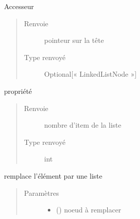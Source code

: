\documentclass[letterpaper,10pt,french]{sphinxmanual}
\begin{document}
\begin{fulllineitems}

\begin{fulllineitems}
\label{\detokenize{linkedlistnode:linkedlistnode.LinkedList.head}}
Accesseur
\begin{quote}\begin{description}
\item[{Renvoie}] \leavevmode
pointeur sur la tête

\item[{Type renvoyé}] \leavevmode
Optional{[}« LinkedListNode »{]}

\end{description}\end{quote}

\end{fulllineitems}


\begin{fulllineitems}
\label{\detokenize{linkedlistnode:linkedlistnode.LinkedList.length}}
propriété
\begin{quote}\begin{description}
\item[{Renvoie}] \leavevmode
nombre d’item de la liste

\item[{Type renvoyé}] \leavevmode
int

\end{description}\end{quote}

\end{fulllineitems}


\begin{fulllineitems}
\label{\detokenize{linkedlistnode:linkedlistnode.LinkedList.replace}}
remplace l’élément par une liste
\begin{quote}\begin{description}
\item[{Paramètres}] \leavevmode\begin{itemize}
\item {} 
 ({\hyperref[\detokenize{linkedlistnode:linkedlistnode.LinkedListNode}]{}}) \textendash{} noeud à remplacer


\end{itemize}
\end{description}
\end{quote}
\end{fulllineitems}
\end{fulllineitems}
\end{document}
